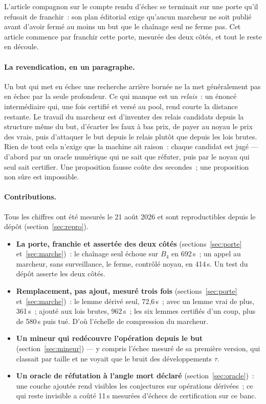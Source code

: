\documentclass[11pt]{article}
\theoremstyle{remark}\newtheorem{remarque}{Remarque}
\begin{document}
L'article compagnon sur le compte rendu d'échec se terminait sur une porte
qu'il refusait de franchir~: son plan éditorial exige qu'aucun marcheur ne
soit publié avant d'avoir fermé au moins un but que le chaînage seul ne ferme
pas. Cet article commence par franchir cette porte, mesurée des deux côtés,
et tout le reste en découle.

\paragraph{La revendication, en un paragraphe.} Un but qui met en échec une
recherche arrière bornée ne la met généralement pas en échec par la seule
profondeur. Ce qui manque est un \emph{relais}~: un énoncé intermédiaire qui,
une fois certifié et versé au pool, rend courte la distance restante. Le
travail du marcheur est d'inventer des relais candidats depuis la structure
même du but, d'écarter les faux à bas prix, de payer au noyau le prix des
vrais, puis d'attaquer le but depuis le relais plutôt que depuis les lois
brutes. Rien de tout cela n'exige que la machine ait raison~: chaque candidat
est jugé --- d'abord par un oracle numérique qui ne sait que réfuter, puis
par le noyau qui seul sait certifier. Une proposition fausse coûte des
secondes~; une proposition non sûre est impossible.

\paragraph{Contributions.} Tous les chiffres ont été mesurés le 21 août 2026
et sont reproductibles depuis le dépôt (section~\ref{sec:repro}).
\begin{itemize}
\item \textbf{La porte, franchie et assertée des deux côtés}
  (sections~\ref{sec:porte} et~\ref{sec:marche})~: le chaînage seul échoue
  sur $B_4$ en 692\,s~; un appel au marcheur, sans surveillance, le ferme,
  contrôlé noyau, en 414\,s. Un test du dépôt asserte les deux côtés.
\item \textbf{Remplacement, pas ajout, mesuré trois fois}
  (sections~\ref{sec:porte} et~\ref{sec:marche})~: le lemme dérivé seul,
  72,6\,s~; avec un lemme vrai de plus, 361\,s~; ajouté aux lois brutes,
  962\,s~; les six lemmes certifiés d'un coup, plus de 580\,s puis tué.
  D'où l'échelle de compression du marcheur.
\item \textbf{Un mineur qui redécouvre l'opération depuis le but}
  (section~\ref{sec:mineur}) --- y compris l'échec mesuré de sa première
  version, qui classait par taille et ne voyait que le bruit des
  développements $\tau$.
\item \textbf{Un oracle de réfutation à l'angle mort déclaré}
  (section~\ref{sec:oracle})~: une couche ajoutée rend visibles les
  conjectures sur opérations dérivées~; ce qui reste invisible a coûté
  11\,s mesurées d'échecs de certification sur ce banc.
\end{itemize}
\end{document}
